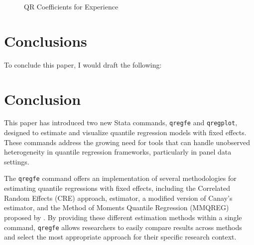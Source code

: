 \documentclass[bib]{statapress}
\begin{document}
\begin{figure}[H]


\caption{\label{fig-ttl-exp}QR Coefficients for Experience}

\end{figure}%

\section{Conclusions}\label{sec:conclusions}

To conclude this paper, I would draft the following:

\section{Conclusion}\label{conclusion}

This paper has introduced two new Stata commands, \texttt{qregfe} and
\texttt{qregplot}, designed to estimate and visualize quantile
regression models with fixed effects. These commands address the growing
need for tools that can handle unobserved heterogeneity in quantile
regression frameworks, particularly in panel data settings.

The \texttt{qregfe} command offers an implementation of several
methodologies for estimating quantile regressions with fixed effects,
including the Correlated Random Effects (CRE) approach,
\citet{canay2011} estimator, a modified version of Canay's estimator,
and the Method of Moments Quantile Regression (MMQREG) proposed by
\citet{mss2019}. By providing these different estimation methods within
a single command, \texttt{qregfe} allows researchers to easily compare
results across methods and select the most appropriate approach for
their specific research context.
\end{document}
